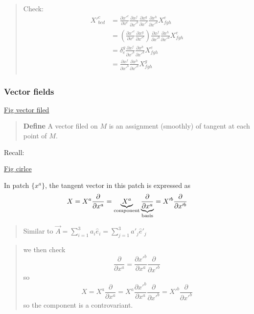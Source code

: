 \begin{quote}
	Check:
\begin{equation}
\begin{aligned}
X'^{c}_{bcd}
&= \frac{\partial x'^{c}}{\partial x^{e}}
\frac{\partial x^{f}}{\partial x'^{b}}
\frac{\partial x^{g}}{\partial x'^{c}}
\frac{\partial x^{h}}{\partial x'^{d}} X^{e}_{fgh}\\
&= \left(\frac{\partial x'^{c}}{\partial x^{e}}
\frac{\partial x^{g}}{\partial x'^{c}}\right)
\frac{\partial x^{f}}{\partial x'^{b}}
\frac{\partial x^{h}}{\partial x'^{d}} X^{e}_{fgh}\\
&= \delta^{g}_{e}
\frac{\partial x^{f}}{\partial x'^{b}}
\frac{\partial x^{h}}{\partial x'^{d}} X^{e}_{fgh}\\
&= \frac{\partial x^{f}}{\partial x'^{b}}
\frac{\partial x^{h}}{\partial x'^{d}} X^{g}_{fgh}\\
\end{aligned}
\end{equation}

\end{quote}
\subsubsection{Vector fields} %

\underline{Fig vector filed}

\begin{quote}
	\textbf{Define}
A vector filed on $M$ is an assignment (smoothly) of tangent at each point of $M$.
\end{quote}

Recall:

\underline{Fig cirlce}

In patch $\{x^{a}\}$, the tangent vector in this patch is expressed as 
\begin{equation}
X = X^{a}\frac{\partial}{\partial x^{a}}
= \underbrace{X^{a}}_{\rm component} \underbrace{\frac{\partial}{\partial x^{a}}}_{\rm basis}
= X'^{b}\frac{\partial}{\partial x'^{b}}
\end{equation}


\begin{quote}
	Similar to $\displaystyle \vec{A} = \sum_{i=1}^{3}a_{i}\hat{e}_i = \sum_{j=1}^{3}a'_{j}\hat{e}'_j$
\end{quote}

\begin{quote}
	we then check
\begin{equation}
\frac{\partial}{\partial x^{a}} = \frac{\partial x'^{b}}{\partial x^{a}} \frac{\partial }{\partial x'^{b}}
\end{equation}
so
\begin{equation}
X
= X^{a}\frac{\partial}{\partial x^{a}}
= X^{a}\frac{\partial x'^{b}}{\partial x^{a}} \frac{\partial }{\partial x'^{b}}
= X'^{b} \frac{\partial }{\partial x'^{b}}
\end{equation}
so the component is a controvariant.
\end{quote}




